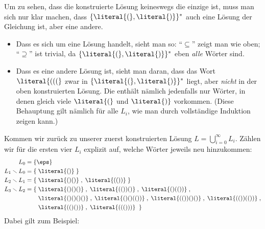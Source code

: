 Um zu sehen, dass die konstruierte Lösung keineswegs die einzige ist,
muss man sich nur klar machen, dass $\{\literal{(}, \literal{)}\}^*$
auch eine Lösung der Gleichung ist, aber eine andere.
\begin{itemize}
\item Dass es sich um eine Lösung handelt, sieht man so:
  "`$\subseteq$"' zeigt man wie oben; "`$\supseteq$"' ist trivial, da
  $\{\literal{(}, \literal{)}\}^*$ eben \emph{alle} Wörter sind.
\item Dass es eine andere Lösung ist, sieht man daran, dass \zB das
  Wort $\literal{(((}$ zwar in $\{\literal{(}, \literal{)}\}^*$ liegt,
  aber \emph{nicht} in der oben konstruierten Lösung. Die enthält
  nämlich jedenfalls nur Wörter, in denen gleich viele $\literal{(}$
  und $\literal{)}$ vorkommen. (Diese Behauptung gilt nämlich für alle
  $L_i$, wie man durch vollständige Induktion zeigen kann.)
\end{itemize}
%
Kommen wir zurück zu unserer zuerst konstruierten Lösung
$L=\bigcup_{i=0}^{\infty} L_i$.  Zählen wir für die ersten vier $L_i$
explizit auf, welche Wörter jeweils neu hinzukommen:
%
\begin{align*}
  L_0 &= \{ \eps \} \\
  L_1 \smallsetminus L_0 &=   \{ \;\literal{()} \;\} \\
  L_2 \smallsetminus L_1 &=   \{\; \literal{()()}\;,\; \literal{(())}\; \} \\
  L_3 \smallsetminus L_2 &= \{ 
  \begin{aligned}[t]
    &\;\literal{()()()}\; , 
    \;\literal{(())()}\; ,
    \;\literal{()(())}\; , \\
    &\;\literal{()()()()}\; ,
    \;\literal{()()(())}\; , 
    \;\literal{(())()()}\; , 
    \;\literal{(())(())}\; , \\
    &\; \literal{(()())}\; ,
    \; \literal{((()))}\; \left.\right\} \\
  \end{aligned} \\
\end{align*}
%
Dabei gilt zum Beispiel:
